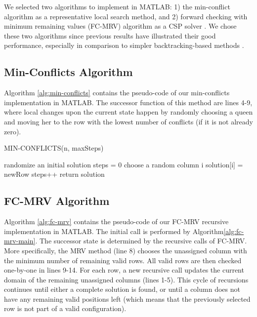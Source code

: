 We selected two algorithms to implement in MATLAB: 1) the min-conflict algorithm as a representative local search method, and 2) forward checking with minimum remaining values (FC-MRV) algorithm as a CSP solver \citep{aima}. We chose these two algorithms since previous results have illustrated their good performance, especially in comparison to simpler backtracking-based methods \citep{aima}.

\subsection{Min-Conflicts Algorithm}

Algorithm \ref{alg:min-conflicts} contains the pseudo-code of our min-conflicts implementation in MATLAB. The successor function of this method are lines 4-9, where local changes upon the current state happen by randomly choosing a queen and moving her to the row with the lowest number of conflicts (if it is not already zero).

\begin{algorithm}
\caption{MIN-CONFLICTS(n, maxSteps)}\label{alg:min-conflicts}
\begin{algorithmic}[1]
\State randomize an initial solution
\State steps = 0
\State choose a random column i
\State solution[i] = newRow
\EndIf
\State steps++
\EndWhile
\State return solution
\end{algorithmic}
\end{algorithm}

\subsection{FC-MRV Algorithm}

Algorithm \ref{alg:fc-mrv} contains the pseudo-code of our FC-MRV recursive implementation in MATLAB. The initial call is performed by Algorithm\ref{alg:fc-mrv-main}. The successor state is determined by the recursive calls of FC-MRV. More specifically, the MRV method (line 8) chooses the unassigned column with the minimum number of remaining valid rows. All valid rows are then checked one-by-one in lines 9-14. For each row, a new recursive call updates the current domain of the remaining unassigned columns (lines 1-5). This cycle of recursions continues until either a complete solution is found, or until a column does not have any remaining valid positions left (which means that the previously selected row is not part of a valid configuration).

